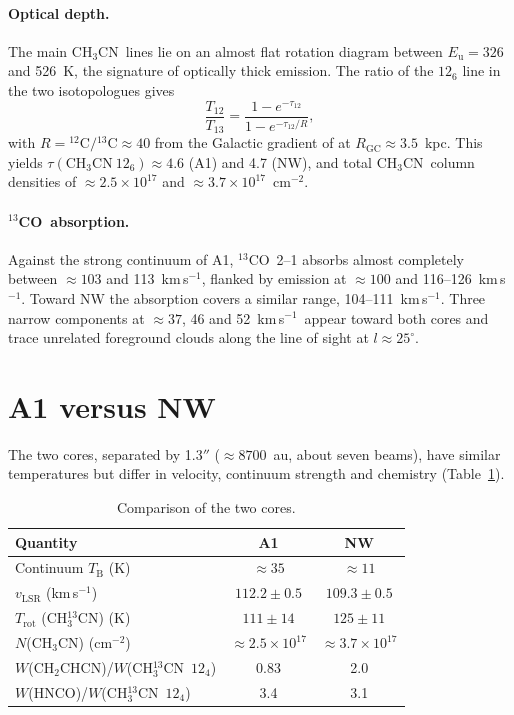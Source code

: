 \documentclass{aa}
\newcommand{\kms}{km\,s$^{-1}$}
\newcommand{\chcn}{CH$_3$CN}
\newcommand{\chtcn}{CH$_3^{13}$CN}
\newcommand{\vycn}{CH$_2$CHCN}
\newcommand{\tco}{$^{13}$CO}
\begin{document}
\paragraph{Optical depth.} The main \chcn\ lines lie on an almost flat rotation diagram between $E_\mathrm{u}=326$ and 526~K, the signature of optically thick emission. The ratio of the $12_6$ line in the two isotopologues gives
\begin{equation}
\frac{T_{12}}{T_{13}} = \frac{1-e^{-\tau_{12}}}{1-e^{-\tau_{12}/R}},
\end{equation}
with $R={}^{12}\mathrm{C}/{}^{13}\mathrm{C}\approx40$ from the Galactic gradient of \citet{milam2005} at $R_\mathrm{GC}\approx3.5$~kpc. This yields $\tau(\mathrm{CH_3CN}~12_6)\approx4.6$ (A1) and 4.7 (NW), and total \chcn\ column densities of $\approx2.5\times10^{17}$ and $\approx3.7\times10^{17}$~cm$^{-2}$.

\paragraph{\tco\ absorption.} Against the strong continuum of A1, \tco\ 2--1 absorbs almost completely between $\approx103$ and 113~\kms, flanked by emission at $\approx100$ and 116--126~\kms. Toward NW the absorption covers a similar range, 104--111~\kms. Three narrow components at $\approx37$, 46 and 52~\kms\ appear toward both cores and trace unrelated foreground clouds along the line of sight at $l\approx25^\circ$.

\section{A1 versus NW}

The two cores, separated by 1.3$''$ ($\approx8700$~au, about seven beams), have similar temperatures but differ in velocity, continuum strength and chemistry (Table~\ref{tab:compare}).

\begin{table}
\caption{Comparison of the two cores.}
\label{tab:compare}
\centering
\begin{tabular}{lcc}
\hline\hline
Quantity & A1 & NW \\
\hline
Continuum $T_\mathrm{B}$ (K) & $\approx35$ & $\approx11$ \\
$v_\mathrm{LSR}$ (\kms) & $112.2\pm0.5$ & $109.3\pm0.5$ \\
$T_\mathrm{rot}$ (\chtcn) (K) & $111\pm14$ & $125\pm11$ \\
$N$(\chcn) (cm$^{-2}$) & $\approx2.5\times10^{17}$ & $\approx3.7\times10^{17}$ \\
$W$(\vycn)/$W$(\chtcn\ $12_4$) & 0.83 & 2.0 \\
$W$(HNCO)/$W$(\chtcn\ $12_4$) & 3.4 & 3.1 \\
\hline
\end{tabular}
\end{table}
\end{document}
